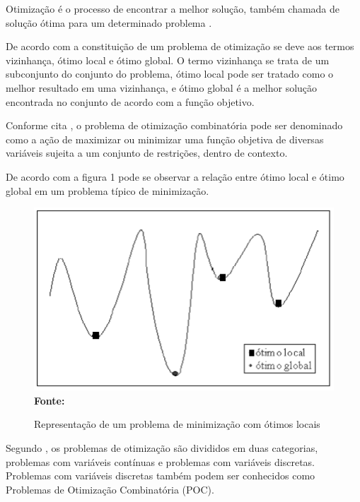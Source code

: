 

Otimização é o processo de encontrar a melhor solução, também chamada de solução ótima para um determinado problema \cite{timoteo2005desenvolvimento}.\par

De acordo com \cite{steiglitz1982combinatorial} a constituição de um problema de otimização se deve aos termos vizinhança, ótimo local e ótimo global. O termo vizinhança se trata de um subconjunto do conjunto do problema, ótimo local pode ser tratado como o melhor resultado em uma vizinhança, e ótimo global é a melhor solução encontrada no conjunto de acordo com a função objetivo.\par

Conforme cita \cite{raupp2003introduccao}, o problema de otimização combinatória pode ser denominado como a ação de maximizar ou minimizar uma função objetiva de diversas variáveis sujeita a um conjunto de restrições, dentro de contexto.\par

De acordo com a figura 1 pode se observar a relação entre ótimo local e ótimo global em um problema típico de minimização.

\begin{figure}[!htb]
\caption[Representação de um problema de minimização com ótimos locais]{Representação de um problema de minimização com ótimos locais}
\label{fig:figura2}
\centering
\includegraphics[scale=0.55]{imagens/problemaOtimizacao.png}
\\ \textbf{\footnotesize Fonte: \cite{timoteo2005desenvolvimento}}
\end{figure}

Segundo \cite{steiglitz1982combinatorial}, os problemas de otimização são divididos em duas categorias, problemas com variáveis contínuas e problemas com variáveis discretas. Problemas com variáveis discretas também podem ser conhecidos como Problemas de Otimização Combinatória (POC).\par

